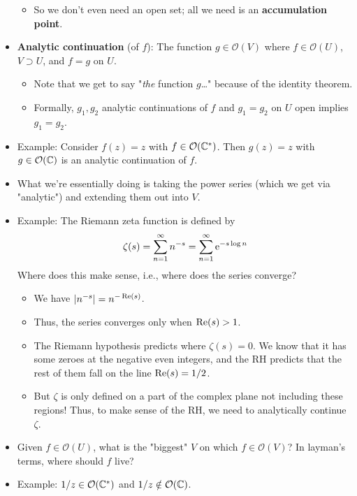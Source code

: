 \documentclass[../notes.tex]{subfiles}
\begin{document}
\begin{itemize}
    \begin{itemize}
        \item So we don't even need an open set; all we need is an \textbf{accumulation point}.
    \end{itemize}
    \item \textbf{Analytic continuation} (of $f$): The function $g\in\mathcal{O}(V)$ where $f\in\mathcal{O}(U)$, $V\supset U$, and $f=g$ on $U$.
    \begin{itemize}
        \item Note that we get to say "\emph{the} function $g$\dots" because of the identity theorem.
        \item Formally, $g_1,g_2$ analytic continuations of $f$ and $g_1=g_2$ on $U$ open implies $g_1=g_2$.
    \end{itemize}
    \item Example: Consider $f(z)=z$ with $f\in\mathcal{O}(\C^*)$. Then $g(z)=z$ with $g\in\mathcal{O}(\C)$ is an analytic continuation of $f$.
    \item What we're essentially doing is taking the power series (which we get via "analytic") and extending them out into $V$.
    \item Example: The Riemann zeta function is defined by
    \begin{equation*}
        \zeta(s) = \sum_{n=1}^\infty n^{-s}
        = \sum_{n=1}^\infty\e[-s\log n]
    \end{equation*}
    Where does this make sense, i.e., where does the series converge?
    \begin{itemize}
        \item We have $|n^{-s}|=n^{-\re(s)}$.
        \item Thus, the series converges only when $\re(s)>1$.
        \item The Riemann hypothesis predicts where $\zeta(s)=0$. We know that it has some zeroes at the negative even integers, and the RH predicts that the rest of them fall on the line $\re(s)=1/2$.
        \item But $\zeta$ is only defined on a part of the complex plane not including these regions! Thus, to make sense of the RH, we need to analytically continue $\zeta$.
    \end{itemize}
    \item Given $f\in\mathcal{O}(U)$, what is the "biggest" $V$ on which $f\in\mathcal{O}(V)$? In layman's terms, where should $f$ live?
    \item Example: $1/z\in\mathcal{O}(\C^*)$ and $1/z\notin\mathcal{O}(\C)$.

\end{itemize}
\end{document}
